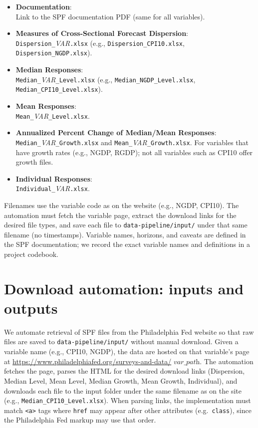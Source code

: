 \documentclass[11pt]{article}
\begin{document}
\begin{itemize}
  \item \textbf{Documentation}: \\
    Link to the SPF documentation PDF (same for all variables).
  \item \textbf{Measures of Cross-Sectional Forecast Dispersion}: \\
    \texttt{Dispersion\_}\textit{VAR}\texttt{.xlsx} (e.g.,
    \texttt{Dispersion\_CPI10.xlsx}, \texttt{Dispersion\_NGDP.xlsx}).
  \item \textbf{Median Responses}: \\
    \texttt{Median\_}\textit{VAR}\texttt{\_Level.xlsx} (e.g.,
    \texttt{Median\_NGDP\_Level.xlsx}, \texttt{Median\_CPI10\_Level.xlsx}).
  \item \textbf{Mean Responses}: \\
    \texttt{Mean\_}\textit{VAR}\texttt{\_Level.xlsx}.
  \item \textbf{Annualized Percent Change of Median/Mean Responses}: \\
    \texttt{Median\_}\textit{VAR}\texttt{\_Growth.xlsx} and
    \texttt{Mean\_}\textit{VAR}\texttt{\_Growth.xlsx}. For variables that have
    growth rates (e.g., NGDP, RGDP); not all variables such as CPI10 offer
    growth files.
  \item \textbf{Individual Responses}: \\
    \texttt{Individual\_}\textit{VAR}\texttt{.xlsx}.
\end{itemize}

Filenames use the variable code as on the website (e.g., NGDP, CPI10). The
automation must fetch the variable page, extract the download links for the
desired file types, and save each file to \texttt{data-pipeline/input/} under
that same filename (no timestamps). Variable names, horizons, and caveats are
defined in the SPF documentation; we record the exact variable names and
definitions in a project codebook.

\section{Download automation: inputs and outputs}

We automate retrieval of SPF files from the Philadelphia Fed website so that
raw files are saved to \texttt{data-pipeline/input/} without manual download.
Given a variable name (e.g., CPI10, NGDP), the data are hosted on that
variable's page at \url{https://www.philadelphiafed.org/surveys-and-data/}%
$\textit{var\_path}$.
The automation fetches the page, parses the HTML for the desired download
links (Dispersion, Median Level, Mean Level, Median Growth, Mean Growth,
Individual), and downloads each file to the input folder under the same
filename as on the site (e.g., \texttt{Median\_CPI10\_Level.xlsx}). When
parsing links, the implementation must match \texttt{<a>} tags where
\texttt{href} may appear after other attributes (e.g.\ \texttt{class}), since
the Philadelphia Fed markup may use that order.
\end{document}
